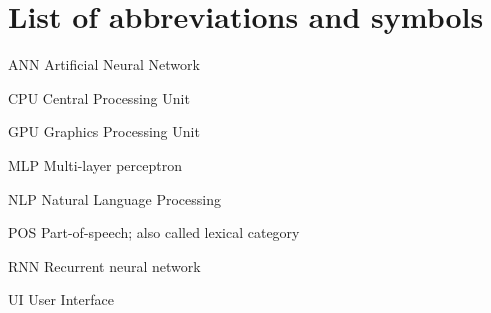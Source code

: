 \documentclass[12pt,a4paper,english
]{tutthesis}
\begin{document}
\setcounter{tocdepth}{3}              %
\tableofcontents                      %


%
%
\chapter*{List of abbreviations and symbols}
\markboth{}{}                                %

\begin{termlist}
\item[ANN] Artificial Neural Network
\item[CPU] Central Processing Unit
\item[GPU] Graphics Processing Unit
\item[MLP] Multi-layer perceptron
\item[NLP] Natural Language Processing
\item[POS] Part-of-speech; also called lexical category
\item[RNN] Recurrent neural network
\item[UI] User Interface
\end{termlist}



\newpage

\if@twoside
\cleardoublepage
\fi

\setcounter{page}{1} %
\renewcommand{\chaptername}{} %
\end{document}
